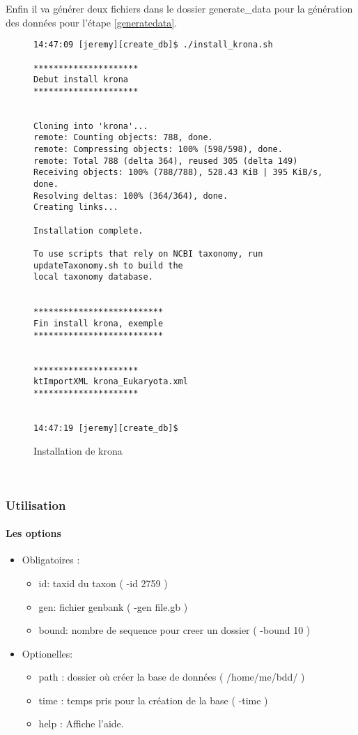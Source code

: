 Enfin il va générer deux fichiers dans le dossier generate\_data pour la génération
des données pour l'étape \ref{generatedata}.
~\\
\begin{figure}[H]

\begin{center}
\begin{verbatim}
14:47:09 [jeremy][create_db]$ ./install_krona.sh 

*********************
Debut install krona
*********************


Cloning into 'krona'...
remote: Counting objects: 788, done.
remote: Compressing objects: 100% (598/598), done.
remote: Total 788 (delta 364), reused 305 (delta 149)
Receiving objects: 100% (788/788), 528.43 KiB | 395 KiB/s, done.
Resolving deltas: 100% (364/364), done.
Creating links...

Installation complete.

To use scripts that rely on NCBI taxonomy, run updateTaxonomy.sh to build the
local taxonomy database.


**************************
Fin install krona, exemple
**************************


*********************
ktImportXML krona_Eukaryota.xml
*********************


14:47:19 [jeremy][create_db]$ 

  \end{verbatim}
\end{center}
\caption{\label{krona}Installation de krona}
\end{figure}
~\\

\subsubsection{Utilisation}
\paragraph{Les options}
\begin{itemize}
 \item Obligatoires :
\begin{itemize}
 
     \item id: taxid du taxon  ( -id 2759 )
     \item gen: fichier genbank ( -gen file.gb )
    \item bound: nombre de sequence pour creer un dossier ( -bound 10 )
  \end{itemize}
  \item Optionelles:
  \begin{itemize}
    \item path : dossier où créer la base de données ( /home/me/bdd/ )
    \item time : temps pris pour la création de la base ( -time )
    \item help : Affiche l'aide.
  \end{itemize}
\end{itemize}

